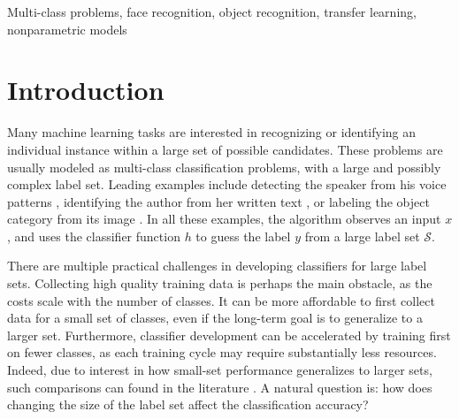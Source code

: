 \documentclass[twoside,11pt]{article}
\begin{document}
\begin{keywords}
Multi-class problems, face recognition, object recognition, transfer learning, nonparametric models
\end{keywords}

\section{Introduction}\label{sec:recog_tasks}

Many machine learning tasks are interested in recognizing or
identifying an individual instance within a large set of possible
candidates. These problems are usually modeled as multi-class
classification problems, with a large and possibly complex label
set. Leading examples include detecting the speaker from his voice
patterns \citep{togneri2011overview}, identifying the author from her
written text \citep{stamatatos2014overview}, or labeling the object
category from its image
\citep{duygulu2002object,deng2010does,oquab2014learning}.  In all
these examples, the algorithm observes an input $x$, and uses the
classifier function $h$ to guess the label $y$ from a large label set
$\mathcal{S}$.

There are multiple practical challenges in developing classifiers for large label sets. Collecting high quality training data is
perhaps the main obstacle, as the costs scale with the number of
classes.  It can be more affordable to first collect data for a small set
of classes, even if the long-term goal is to generalize to a larger
set.  Furthermore, classifier development can be accelerated by
training first on fewer classes, as each training cycle may require
substantially less resources.  Indeed, due to interest in how
small-set performance generalizes to larger sets, such comparisons can
found in the literature \citep{oquab2014learning, griffin2007caltech}.
A natural question is: how does changing the size of the label set
affect the classification accuracy?
\end{document}
